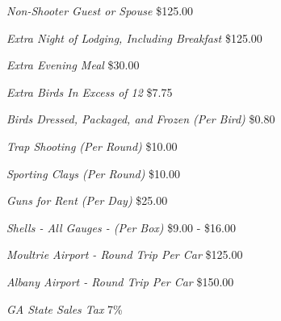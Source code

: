 \documentclass[margin, 11pt]{res}
\begin{document}
\begin{resume}
{\sl Non-Shooter Guest or Spouse} \hfill \$125.00\\
\vspace{-.05 truein}

{\sl Extra Night of Lodging, Including Breakfast} \hfill \$125.00\\
\vspace{-.05 truein}

{\sl Extra Evening Meal} \hfill \$30.00\\
\vspace{-.05 truein}

{\sl Extra Birds In Excess of 12} \hfill \$7.75\\
\vspace{-.05 truein}

{\sl Birds Dressed, Packaged, and Frozen (Per Bird)} \hfill \$0.80\\
\vspace{-.05 truein}

{\sl Trap Shooting (Per Round)} \hfill \$10.00\\
\vspace{-.05 truein}

{\sl Sporting Clays (Per Round)} \hfill \$10.00\\
\vspace{-.05 truein}

{\sl Guns for Rent (Per Day)} \hfill \$25.00\\
\vspace{-.05 truein}

{\sl Shells - All Gauges - (Per Box)} \hfill \$9.00 - \$16.00\\
\vspace{-.05 truein}

{\sl Moultrie Airport - Round Trip Per Car} \hfill \$125.00\\
\vspace{-.05 truein}

{\sl Albany Airport - Round Trip Per Car} \hfill \$150.00\\
\vspace{-.05 truein}

{\sl GA State Sales Tax} \hfill 7\%\\
\vspace{-.05 truein}



\end{resume}
\end{document}
